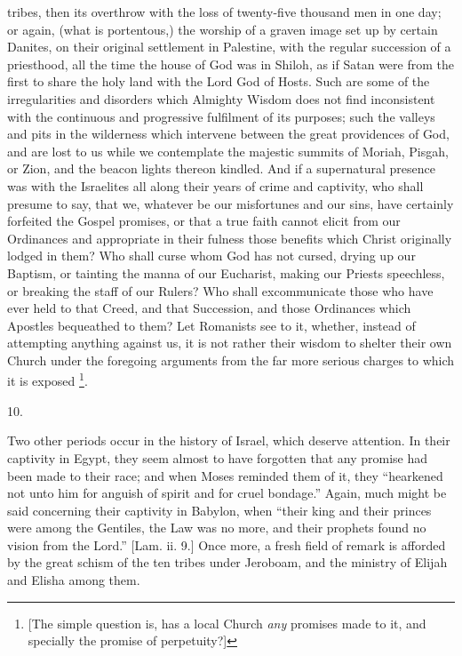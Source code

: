 tribes, then its overthrow with the loss of twenty-five thousand men
in one day; or again, (what is portentous,) the worship of a graven
image set up by certain Danites, on their original settlement in
Palestine, with the regular succession of a priesthood, all the time
the house of God was in Shiloh, as if Satan were from the first to
share the holy land with the Lord God of Hosts. Such are some of the
irregularities and disorders which Almighty Wisdom does not find
inconsistent with the continuous and progressive fulfilment of its
purposes; such the valleys and pits in the wilderness which intervene
between the great providences of God, and are lost to us while we
contemplate the majestic summits of Moriah, Pisgah, or Zion, and the
beacon lights thereon kindled. And if a supernatural presence was with
the Israelites all along their years of crime and captivity, who shall
presume to say, that we, whatever be our misfortunes and our sins,
have certainly forfeited the Gospel promises, or that a true faith
cannot elicit from our Ordinances and appropriate in their
fulness those benefits which Christ originally lodged in them? Who
shall curse whom God has not cursed, drying up our Baptism, or
tainting the manna of our Eucharist, making our Priests speechless, or
breaking the staff of our Rulers? Who shall excommunicate those who
have ever held to that Creed, and that Succession, and those
Ordinances which Apostles bequeathed to them? Let Romanists see to it,
whether, instead of attempting anything against us, it is not rather
their wisdom to shelter their own Church under the foregoing arguments
from the far more serious charges to which it is exposed \footnote{[The simple question is, has a local Church \emph{any}
promises made to it, and specially the promise of perpetuity?]}.

10.

Two other periods occur in the history of Israel, which deserve
attention. In their captivity in Egypt, they seem almost to have
forgotten that any promise had been made to their race; and when Moses
reminded them of it, they ``hearkened not unto him for anguish of
spirit and for cruel bondage.'' Again, much might be said
concerning their captivity in Babylon, when ``their king and their
princes were among the Gentiles, the Law was no more, and their
prophets found no vision from the Lord.'' [Lam. ii. 9.] Once more,
a fresh field of remark is afforded by the great schism of the ten
tribes under Jeroboam, and the ministry of Elijah and Elisha among
them.

